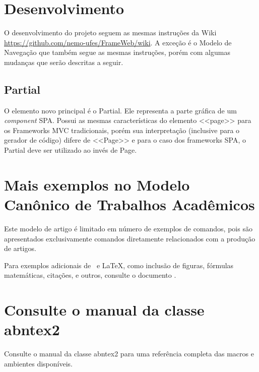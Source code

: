 \documentclass[
article,			%
11pt,				%
oneside,			%
a4paper,			%
english,			%
brazil,				%
sumario=tradicional
]{abntex2}
\begin{document}



\section{Desenvolvimento}
O desenvolvimento do projeto seguem as mesmas instruções da Wiki \url{https://github.com/nemo-ufes/FrameWeb/wiki}. A exceção é o Modelo de Navegação que também segue as mesmas instruções, porém com algumas mudanças que serão descritas a seguir.
	
\subsection{Partial}

O elemento novo principal é o Partial. Ele representa a parte gráfica de um \textit{component} SPA. Possui as mesmas características do elemento <<page>> para os Frameworks MVC tradicionais, porém sua interpretação (inclusive para o gerador de código) difere de <<Page>> e para o caso dos frameworks SPA, o Partial deve ser utilizado ao invés de Page.	

	
	\section{Mais exemplos no Modelo Canônico de Trabalhos Acadêmicos}
	
	Este modelo de artigo é limitado em número de exemplos de comandos, pois são
	apresentados exclusivamente comandos diretamente relacionados com a produção de
	artigos.
	
	Para exemplos adicionais de \abnTeX\ e \LaTeX, como inclusão de figuras,
	fórmulas matemáticas, citações, e outros, consulte o documento
	.
	
	\section{Consulte o manual da classe \textsf{abntex2}}
	
	Consulte o manual da classe \textsf{abntex2} \cite{abntex2classe} para uma
	referência completa das macros e ambientes disponíveis.
	
\end{document}
